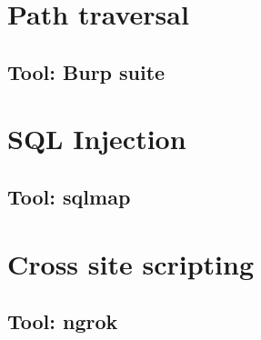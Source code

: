 \documentclass{beamer}
\begin{document}
\section{Path traversal}
\begin{frame}{}
\end{frame}

\subsection{Tool: Burp suite}

\begin{frame}{}
\end{frame}

\section{SQL Injection}
\begin{frame}{}
\end{frame}

\subsection{Tool: sqlmap}
\begin{frame}{}
\end{frame}


\section{Cross site scripting}
\begin{frame}{}
\end{frame}

\subsection{Tool: ngrok}
\begin{frame}{}
\end{frame}
\end{document}
